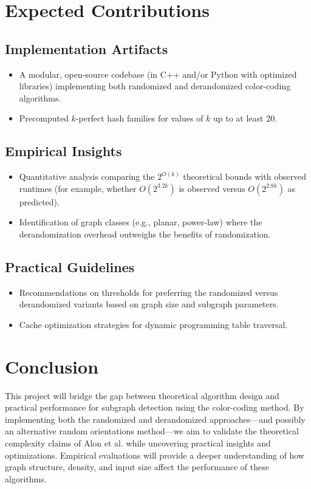 \section{Expected Contributions}
\subsection{Implementation Artifacts}
\begin{itemize}
    \item A modular, open-source codebase (in C++ and/or Python with optimized libraries) implementing both randomized and derandomized color-coding algorithms.
    \item Precomputed \(k\)-perfect hash families for values of \(k\) up to at least 20.
\end{itemize}

\subsection{Empirical Insights}
\begin{itemize}
    \item Quantitative analysis comparing the \(2^{O(k)}\) theoretical bounds with observed runtimes (for example, whether \(O(2^{3.2k})\) is observed versus \(O(2^{2.8k})\) as predicted).
    \item Identification of graph classes (e.g., planar, power-law) where the derandomization overhead outweighs the benefits of randomization.
\end{itemize}

\subsection{Practical Guidelines}
\begin{itemize}
    \item Recommendations on thresholds for preferring the randomized versus derandomized variants based on graph size and subgraph parameters.
    \item Cache optimization strategies for dynamic programming table traversal.
\end{itemize}

\section{Conclusion}
This project will bridge the gap between theoretical algorithm design and practical performance for subgraph detection using the color-coding method. By implementing both the randomized and derandomized approaches—and possibly an alternative random orientations method—we aim to validate the theoretical complexity claims of Alon et al. \cite{alon1995color} while uncovering practical insights and optimizations. Empirical evaluations will provide a deeper understanding of how graph structure, density, and input size affect the performance of these algorithms.

